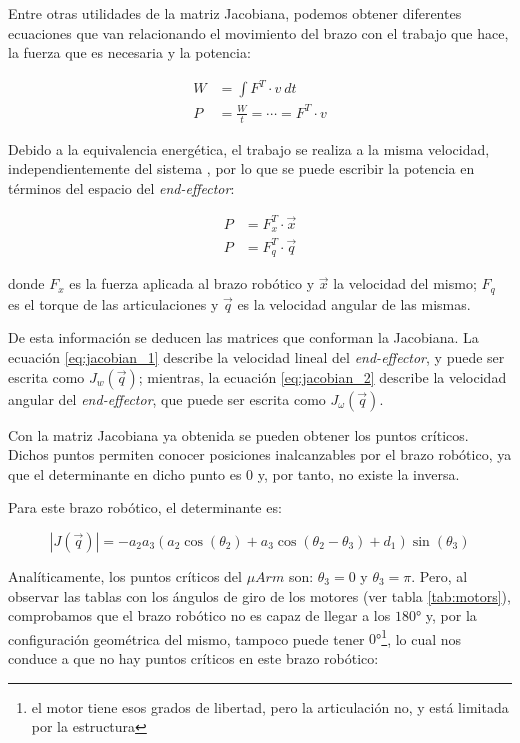 \documentclass[a4paper,12pt]{article}
\begin{document}
Entre otras utilidades de la matriz Jacobiana, podemos obtener diferentes ecuaciones
que van relacionando el movimiento del brazo con el trabajo que hace, la fuerza que
es necesaria y la potencia:

\begin{align}
    W & = \int F^T \cdot v ~ dt              \\
    P & = \frac{W}{t} = \cdots = F^T \cdot v
\end{align}

Debido a la equivalencia energética, el trabajo se realiza a la misma velocidad,
independientemente del sistema \cite{travisdewolf_robot_2013}, por lo que se puede
escribir la potencia en términos del espacio del \textit{end-effector}:

\begin{align}
    P & = F_x^T \cdot \vec{x} \\
    P & = F_q^T \cdot \vec{q}
\end{align}

donde $F_x$ es la fuerza aplicada al brazo robótico y $\vec{x}$ la velocidad del mismo;
$F_q$ es el torque de las articulaciones y $\vec{q}$ es la velocidad angular de las mismas.

De esta información se deducen las matrices que conforman la Jacobiana. La ecuación
\ref{eq:jacobian_1} describe la velocidad lineal del \textit{end-effector}, y puede
ser escrita como $J_w(\vec{q})$; mientras, la ecuación \ref{eq:jacobian_2} describe la
velocidad angular del \textit{end-effector}, que puede ser escrita como $J_\omega(\vec{q})$.

Con la matriz Jacobiana ya obtenida se pueden obtener los puntos críticos. Dichos puntos
permiten conocer posiciones inalcanzables por el brazo robótico, ya que el determinante
en dicho punto es 0 y, por tanto, no existe la inversa.

Para este brazo robótico, el determinante es:

\begin{equation} \label{eq:det_j}
    |J(\vec{q})| = - a_{2} a_{3} \left(a_{2} \cos{\left(\theta_{2} \right)} + a_{3} \cos{\left(\theta_{2} - \theta_{3} \right)} + d_{1}\right) \sin{\left(\theta_{3} \right)}
\end{equation}

Analíticamente, los puntos críticos del $\mu Arm$ son: $\theta_3 = 0$ y $\theta_3 = \pi$.
Pero, al observar las tablas con los ángulos de giro de los motores (ver tabla \ref{tab:motors}),
comprobamos que el brazo robótico no es capaz de llegar a los $\ang{180}$ y, por la configuración
geométrica del mismo, tampoco puede tener $\ang{0}$\footnote
{el motor tiene esos grados de libertad, pero la articulación no, y está limitada por la estructura},
lo cual nos conduce a que no hay puntos críticos en este brazo robótico:
\end{document}
